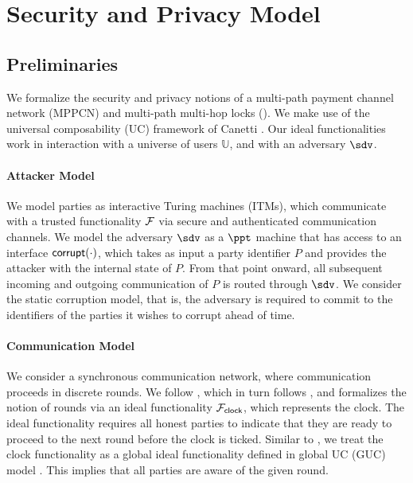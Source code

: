 \section{Security and Privacy Model}
\label{sec:security-model}

\subsection{Preliminaries}
\label{sec:model-prelims}

We formalize the security and privacy notions of a multi-path payment channel network (MPPCN) 
and multi-path multi-hop locks (\sysname). We make use of the universal composability (UC) 
framework of Canetti \cite{canetti}. Our ideal functionalities work in interaction with 
a universe of users $\mathbb{U}$, and with an adversary $\sdv$.

\paragraph{Attacker Model}
We model parties as interactive Turing machines (ITMs), which communicate with a trusted 
functionality $\mathcal{F}$ via secure and authenticated communication channels. We model the 
adversary $\sdv$ as a $\ppt$ machine that has access to an interface $\mathsf{corrupt}(\cdot)$, 
which takes as input a party identifier $P$ and provides the attacker with the internal 
state of $P$. From that point onward, all subsequent incoming and outgoing communication 
of $P$ is routed through $\sdv$. We consider the static corruption model, that is, the 
adversary is required to commit to the identifiers of the parties it wishes to corrupt 
ahead of time.

\paragraph{Communication Model}

We consider a synchronous communication network, where communication proceeds in discrete 
rounds. We follow \cite{kmtz}, which in turn follows \cite{mpvsc}, and formalizes the notion of 
rounds via an ideal functionality $\mathcal{F}_{\mathsf{clock}}$, which represents the clock. The ideal 
functionality requires all honest parties to indicate that they are ready to proceed to the next 
round before the clock is ticked. Similar to \cite{mpvsc}, we treat the clock functionality as a 
global ideal functionality defined in global UC (GUC) model \cite{guc}. This implies that all 
parties are aware of the given round. 

